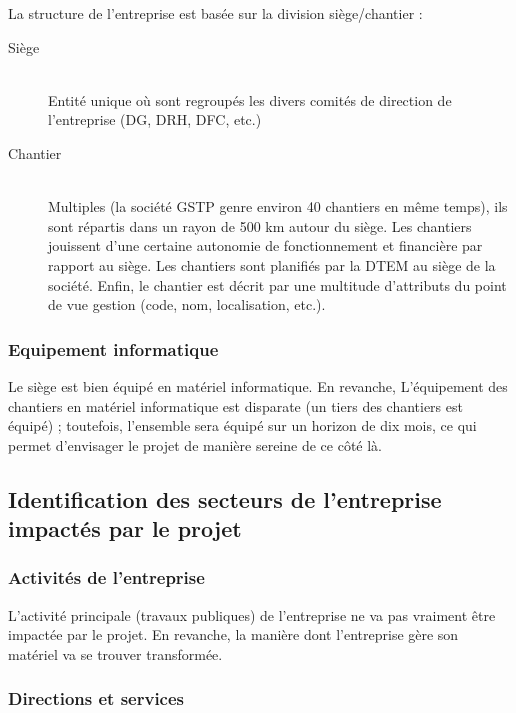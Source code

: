 \documentclass[12pt]{article}
\begin{document}
La structure de l'entreprise est basée sur la division siège/chantier :
\begin{description}
\item[Siège]\hfill\\ 
Entité unique où sont regroupés les divers comités de direction de l'entreprise (DG, DRH, DFC, etc.)

\item[Chantier]\hfill\\
Multiples (la société GSTP genre environ 40 chantiers en même temps),
ils sont répartis dans un rayon de 500 km autour du siège.
Les chantiers jouissent d'une certaine autonomie de fonctionnement et
financière par rapport au siège. Les chantiers sont planifiés par la DTEM
au siège de la société. Enfin, le chantier est décrit par une multitude
d'attributs du point de vue gestion (code, nom, localisation, etc.).\\
\end{description}


\subsubsection{Equipement informatique}

Le siège est bien équipé en matériel informatique. En revanche, 
L'équipement des chantiers en matériel informatique est disparate (un tiers
des chantiers est équipé) ; toutefois, l'ensemble sera équipé sur un horizon de
dix mois, ce qui permet d'envisager le projet de manière sereine de ce côté
là.


\subsection{Identification des secteurs de l'entreprise impactés par le projet}

\subsubsection{Activités de l'entreprise}

L'activité principale (travaux publiques) de l'entreprise ne va pas
vraiment être impactée par le projet. En revanche, la manière dont
l'entreprise gère son matériel va se trouver transformée.


\subsubsection{Directions et services}
\end{document}
